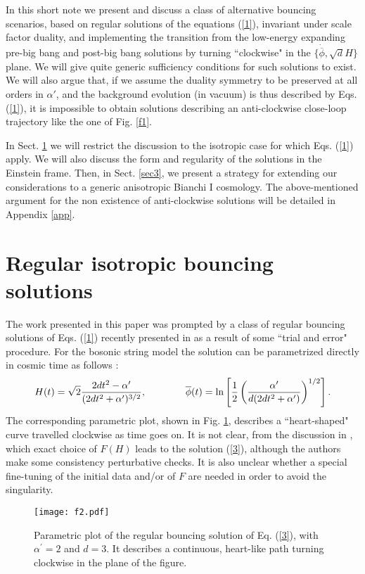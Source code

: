 \documentclass[a4paper,11pt]{article}
\def\beq{\begin{equation}}
\def\eeq{\end{equation}}
\def \ap {\alpha^{\prime}}
\def \fb {\overline \phi}
\def \fbp {\dot{\fb}}
\begin{document}
In this short note we present and discuss a class of alternative bouncing scenarios, based on regular solutions of the equations (\ref{1}), invariant under scale factor duality, and implementing the transition from the low-energy expanding pre-big bang and post-big bang solutions by turning ``clockwise" in the $\{\fbp, \sqrt d H\}$ plane. We will give quite generic sufficiency conditions for such solutions to exist. We will also argue that,
 if we assume the duality symmetry to be preserved at all orders in $\alpha'$, and the background evolution (in vacuum) is thus described by Eqs. (\ref{1}), it is impossible to obtain solutions describing an anti-clockwise close-loop trajectory like the one of Fig. \ref{f1}.
 
 In Sect. \ref{sec2} we will restrict the discussion to the isotropic case for which Eqs. (\ref{1}) apply. We will also discuss the form and regularity of the solutions in the Einstein frame. Then, in Sect. \ref{sec3}, we present a strategy for extending our considerations  to a generic anisotropic Bianchi I cosmology.  The above-mentioned argument for the non existence of anti-clockwise solutions will be detailed in  Appendix \ref{app}.


\section{Regular isotropic bouncing solutions}
\label{sec2}

The work presented in this paper was prompted  by a class of regular bouncing solutions of Eqs. (\ref{1}) recently presented in \cite{2} as a result of some ``trial and error" procedure. For the bosonic string model the solution can be parametrized directly in cosmic time as follows \cite{2}:
\beq
H(t)=\sqrt{2}{2dt^2- \ap\over (2dt^2 + \ap)^{3/2}}, ~~~~~~~~~~~~
\fb(t)=\ln \left[{1\over 2} \left(\ap \over d (2dt^2 + \ap)\right)^{1/2}
\right].
\label{3}
\eeq
The corresponding parametric plot, shown in Fig. \ref{f2}, describes a ``heart-shaped" curve travelled clockwise as time goes on. It is not clear, from the discussion in \cite{2}, which exact choice of $F(H)$ leads to the solution (\ref{3}), although the authors make some consistency perturbative checks. It is also unclear whether a special fine-tuning of the initial data and/or of $F$ are needed in order to avoid the singularity.

\begin{figure}[t]
\centering
\texttt{[image: f2.pdf]}
\caption{Parametric plot of the regular bouncing solution of Eq. (\ref{3}), with $\ap=2$ and $d=3$. It describes a continuous, heart-like path turning clockwise in the plane of the figure.}
\label{f2}
\end{figure}
\end{document}
